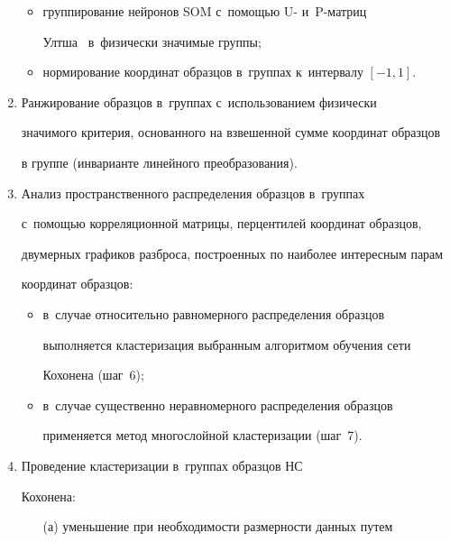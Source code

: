 \begin{enumerate}[1.]
\begin{itemize}
\item группирование нейронов SOM с~помощью U- и~P-мат\-риц 


Ултша~\cite{6-anik} в~физически значимые группы;\\[-15pt] 


\item нормирование координат образцов в~группах к~интервалу $[-1, 1]$. 


\end{itemize}


\item Ранжирование образцов в~группах с~использованием физически 


значимого критерия, основанного на взвешенной сумме координат образцов 


в группе (инварианте линейного преобразования). %


\item Анализ пространственного распределения образцов в~группах 


с~помощью корреляционной матрицы, перцентилей координат образцов, 


двумерных графиков разброса, построенных по наиболее интересным парам 


координат образцов:\\[-15pt]


\begin{itemize}


\item в~случае относительно равномерного распределения образцов 


выполняется кластеризация выбранным алгоритмом обучения сети 


Кохонена (шаг~6);\\[-15pt]


\item в~случае существенно неравномерного распределения образцов 


применяется метод многослойной кластеризации (шаг~7).


\end{itemize}


\item Проведение кластеризации в~группах образцов НС


Кохонена:\\[-15pt]


\begin{itemize}


\item[(а)] уменьшение при необходимости размерности данных путем 



\end{itemize}
\end{enumerate}
